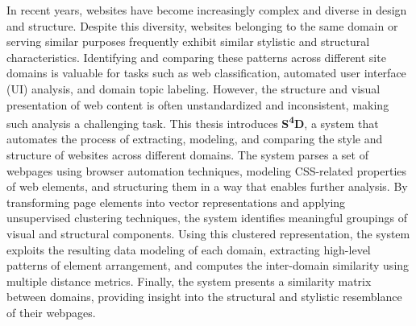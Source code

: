 In recent years, websites have become increasingly complex and diverse in design and structure. Despite this diversity, websites belonging to the same domain or serving similar purposes frequently exhibit similar stylistic and structural characteristics. Identifying and comparing these patterns across different site domains is valuable for tasks such as web classification, automated user interface (UI) analysis, and domain topic labeling. However, the structure and visual presentation of web content is often unstandardized and inconsistent, making such analysis a challenging task. This thesis introduces \textlatin{\textbf{S\textsuperscript{4}D}}, a system that automates the process of extracting, modeling, and comparing the style and structure of websites across different domains. The system parses a set of webpages using browser automation techniques, modeling CSS-related properties of web elements, and structuring them in a way that enables further analysis. By transforming page elements into vector representations and applying unsupervised clustering techniques, the system identifies meaningful groupings of visual and structural components. Using this clustered representation, the system exploits the resulting data modeling of each domain, extracting high-level patterns of element arrangement, and computes the inter-domain similarity using multiple distance metrics. Finally, the system presents a similarity matrix between domains, providing insight into the structural and stylistic resemblance of their webpages.